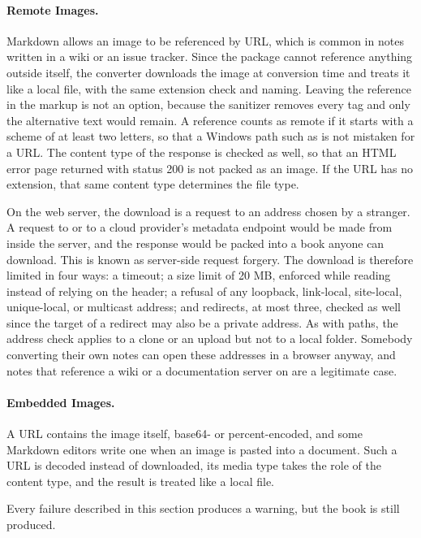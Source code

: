 \paragraph{Remote Images.}
Markdown allows an image to be referenced by URL, which is common in notes written in a wiki or an
issue tracker.
Since the package cannot reference anything outside itself, the converter downloads the image at
conversion time and treats it like a local file, with the same extension check and naming.
Leaving the reference in the markup is not an option, because the sanitizer removes every
 tag and only the alternative text would remain.
A reference counts as remote if it starts with a scheme of at least two letters, so that a Windows
path such as  is not mistaken for a URL.
The content type of the response is checked as well, so that an HTML error page returned with
status 200 is not packed as an image.
If the URL has no extension, that same content type determines the file type.

On the web server, the download is a request to an address chosen by a stranger.
A request to  or to a cloud provider's metadata endpoint would be made
from inside the server, and the response would be packed into a book anyone can download.
This is known as server-side request forgery.
The download is therefore limited in four ways:
a timeout;
a size limit of 20 MB, enforced while reading instead of relying on the 
header;
a refusal of any loopback, link-local, site-local, unique-local, or multicast address;
and redirects, at most three, checked as well since the target of a redirect may also be a private
address.
As with paths, the address check applies to a clone or an upload but not to a local folder.
Somebody converting their own notes can open these addresses in a browser anyway, and notes that
reference a wiki or a documentation server on  are a legitimate case.

\paragraph{Embedded Images.}
A  URL contains the image itself, base64- or percent-encoded, and some Markdown editors
write one when an image is pasted into a document.
Such a URL is decoded instead of downloaded, its media type takes the role of the content type, and
the result is treated like a local file.

Every failure described in this section produces a warning, but the book is still produced.
